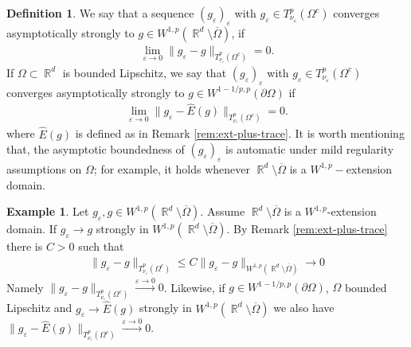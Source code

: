 \documentclass[12pt, reqno]{amsart}%
\theoremstyle{plain}  %
\theoremstyle{definition}  %
\newtheorem{definition}[theorem]{Definition}
\newtheorem{example}[theorem]{Example}
\numberwithin{equation}{section}
\DeclareMathOperator{\R}{\mathbb{R}}
\newcommand{\eps}{\varepsilon}
\newcommand{\TnuOma}{T^p_{\nu_\eps} (\Omega^c)}
\begin{document}
 \begin{definition}\label{def:asymp-strong-Dir}
 We say that a  sequence $ (g_\eps)_\eps$ with $g_\eps\in  \TnuOma$ converges asymptotically strongly to $g\in W^{1,p}(\R^d\setminus\overline{\Omega})$, if
\begin{align*}
\lim_{\eps\to0}	\|g_\eps-g\|_{T^p_{\nu_\eps}(\Omega^c)}=0.
\end{align*}
If $\Omega\subset \R^d$ is bounded Lipschitz, we say that  $ (g_\eps)_\eps$ with $g_\eps\in  \TnuOma$ converges asymptotically strongly to $g\in W^{1-1/p,p}(\partial\Omega)$ if
\begin{align*}
\lim_{\eps\to0}	\|g_\eps-\widehat{E}(g)\|_{T^p_{\nu_\eps}(\Omega^c)}=0.
\end{align*}
where $\widehat{E}(g)$ is defined as in Remark \ref{rem:ext-plus-trace}.   It is worth mentioning that, the asymptotic boundedness of $(g_\eps)_\eps$ is automatic under mild regularity assumptions on $\Omega$; for example, it holds whenever $\R^d \setminus \overline{\Omega}$ is a $W^{1,p}-$extension domain.
\end{definition}
\begin{example}
Let $g_\eps, g\in W^{1,p}(\R^d\setminus \overline{\Omega})$. Assume $\R^d\setminus \overline{\Omega}$ is a $W^{1,p}$-extension domain. If $g_\eps\to  g$ strongly in $W^{1,p}(\R^d\setminus \overline{\Omega})$. By Remark \ref{rem:ext-plus-trace} there is $C>0$ such that
\begin{align*}
	\|g_\eps-g\|_{T^p_{\nu_\eps}(\Omega^c)}   	\leq C\|g_\eps-g\|_{W^{1,p}(\R^d\setminus \overline{\Omega})}\to 0
\end{align*}
Namely $\|g_\eps-g\|_{T^p_{\nu_\eps}(\Omega^c)}\xrightarrow{\eps\to0}0$.
Likewise, if $g\in W^{1-1/p, p}(\partial \Omega)$,   $\Omega$ bounded Lipschitz and  $g_\eps\to  \widehat{E}(g)$ strongly in $W^{1,p}(\R^d\setminus \overline{\Omega})$
we also have $ \|g_\eps-\widehat{E}(g)\|_{T^p_{\nu_\eps}(\Omega^c)}
\xrightarrow{\eps\to0}0.$
\end{example}
\end{document}
